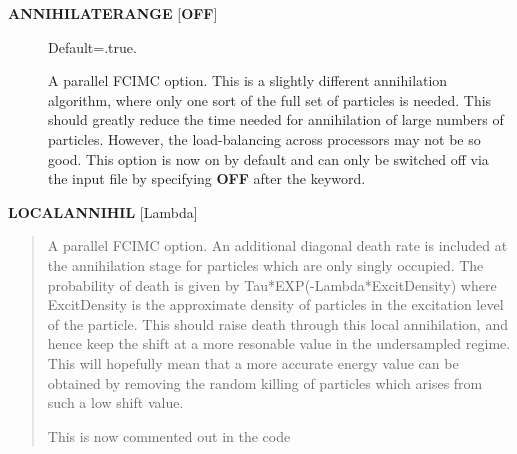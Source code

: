 \documentclass[openany,a4paper,10pt]{manual}
\begin{document}
\begin{description}
\item[\textbf{ANNIHILATERANGE} {[}\textbf{OFF}{]}]
Default=.true.

A parallel FCIMC option. This is a slightly different annihilation algorithm, where only
one sort of the full set of particles is needed. This should greatly reduce the time needed
for annihilation of large numbers of particles. However, the load-balancing across processors
may not be so good. This option is now on by default and can only be switched off via the input
file by specifying \textbf{OFF} after the keyword.

\end{description}

\textbf{LOCALANNIHIL} {[}Lambda{]}
\begin{quote}

A parallel FCIMC option. An additional diagonal death rate is included at the annihilation
stage for particles which are only singly occupied. The probability of death is given by
Tau*EXP(-Lambda*ExcitDensity) where ExcitDensity is the approximate density of particles in
the excitation level of the particle. This should raise death through this local annihilation,
and hence keep the shift at a more resonable value in the undersampled regime. This will
hopefully mean that a more accurate energy value can be obtained by removing the random
killing of particles which arises from such a low shift value.

This is now commented out in the code
\end{quote}
\end{document}
